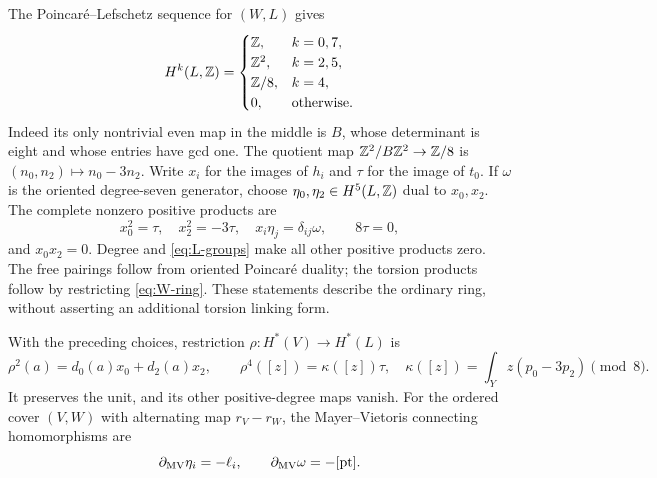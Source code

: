The Poincar\'e--Lefschetz sequence for $(W,L)$ gives
\begin{equation}\label{eq:L-groups}
 H^k(L,\mathbb Z)=
 \begin{cases}
 \mathbb Z,&k=0,7,\\
 \mathbb Z^2,&k=2,5,\\
 \mathbb Z/8,&k=4,\\
 0,&\text{otherwise}.
 \end{cases}
\end{equation}
Indeed its only nontrivial even map in the middle is $B$,
whose determinant is eight and whose entries have gcd one.
The quotient map $\mathbb Z^2/B\mathbb Z^2\to\mathbb Z/8$ is
$(n_0,n_2)\mapsto n_0-3n_2$.
Write $x_i$ for the images of $h_i$ and $\tau$ for the
image of $t_0$. If $\omega$ is the oriented degree-seven
generator, choose $\eta_0,\eta_2\in H^5(L,\mathbb Z)$ dual to $x_0,x_2$.
The complete nonzero positive products are
\begin{equation}\label{eq:L-products}
 x_0^2=\tau,\quad x_2^2=-3\tau,\quad
 x_i \eta_j=\delta_{ij}\omega,\qquad 8\tau=0,
\end{equation}
and $x_0x_2=0$. Degree and \eqref{eq:L-groups} make all
other positive products zero. The free pairings follow from
oriented Poincar\'e duality; the torsion products follow by
restricting \eqref{eq:W-ring}. These statements describe the
ordinary ring, without asserting an additional torsion linking form.

\begin{proposition}\label{prop:boundary}
With the preceding choices, restriction $\rho:H^*(V)\to H^*(L)$
is
\begin{equation}\label{eq:rho}
 \rho^2(a)=d_0(a)x_0+d_2(a)x_2,\qquad
 \rho^4([z])=\kappa([z])\tau,\quad
 \kappa([z])=\int_Yz(p_0-3p_2)\pmod8.
\end{equation}
It preserves the unit, and its other positive-degree maps vanish.
For the ordered cover $(V,W)$ with alternating map $r_V-r_W$,
the Mayer--Vietoris connecting homomorphisms are
\begin{equation}\label{eq:MV}
 \partial_{\mathrm{MV}}\eta_i=-\ell_i,\qquad
 \partial_{\mathrm{MV}}\omega=-[\mathrm{pt}].
\end{equation}
\end{proposition}

